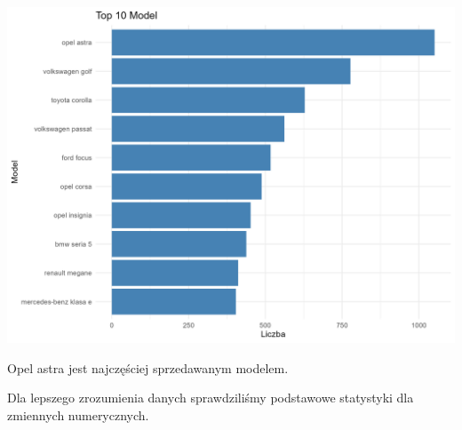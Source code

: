 \documentclass[
]{article}
\begin{document}
\includegraphics[width=1\linewidth]{analiza/wykres_top_model}

Opel astra jest najczęściej sprzedawanym modelem.

Dla lepszego zrozumienia danych sprawdziliśmy podstawowe statystyki dla
zmiennych numerycznych.
\end{document}
